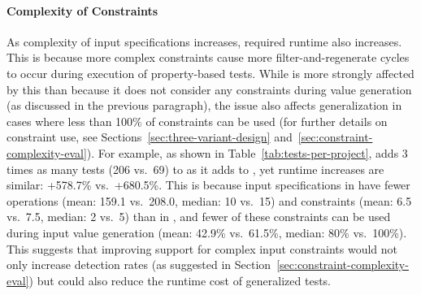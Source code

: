 \paragraph{Complexity of Constraints}

As complexity of input specifications increases,
required runtime also increases.
This is because more complex constraints
cause more filter-and-regenerate cycles to occur
during execution of property-based tests.
While \VariantNaive{}
is more strongly affected by this than \VariantImproved{}
because it does not consider any constraints during value generation
(as discussed in the previous paragraph),
the issue also affects \VariantImproved{} generalization
in cases where less than 100\% of constraints can be used
(for further details on constraint use,
see Sections~\ref{sec:three-variant-design} and~\ref{sec:constraint-complexity-eval}).
For example, as shown in Table~\ref{tab:tests-per-project},
\VariantImprovedC{} adds 3 times as many tests (206 vs.\ 69) to \DatasetEqBenchA{}
as it adds to \DatasetCommonsA{},
yet runtime increases are similar: +578.7\% vs.\ +680.5\%.
This is because input specifications in \DatasetEqBenchA{}
have fewer operations (mean: 159.1 vs.\ 208.0, median: 10 vs.\ 15)
and constraints (mean: 6.5 vs.\ 7.5, median: 2 vs.\ 5)
than in \DatasetCommonsA{}, 
and fewer of these constraints
can be used during input value generation
(mean: 42.9\% vs.\ 61.5\%, median: 80\% vs.\ 100\%).
This suggests that improving support for complex input constraints
would not only increase detection rates
(as suggested in Section~\ref{sec:constraint-complexity-eval})
but could also reduce the runtime cost of generalized tests.

